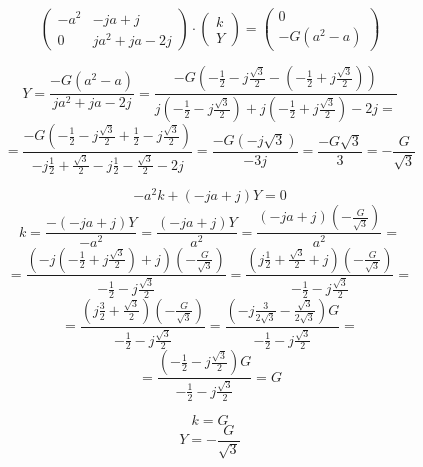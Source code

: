 \documentclass{article}
\begin{document}
$$
    \begin{pmatrix}
        -a^2 & - j a + j         \\
        0    & j a^2 + j a - 2 j
    \end{pmatrix}
    \cdot
    \begin{pmatrix}
        k \\
        Y
    \end{pmatrix}
    =
    \begin{pmatrix}
        0 \\
        - G (a^2 - a)
    \end{pmatrix}
$$

$$
    Y = \frac{- G (a^2 - a)}{j a^2 + j a - 2 j} = \frac{
        - G \left( -\frac{1}{2} - j \frac{\sqrt{3}}{2} - \left( -\frac{1}{2} + j \frac{\sqrt{3}}{2} \right) \right)
    }{
        j \left( -\frac{1}{2} - j \frac{\sqrt{3}}{2} \right) + j \left( -\frac{1}{2} + j \frac{\sqrt{3}}{2} \right) - 2 j =
    }
$$
$$
    = \frac{
        - G \left( -\frac{1}{2} - j \frac{\sqrt{3}}{2} + \frac{1}{2} - j \frac{\sqrt{3}}{2} \right)
    }{
        -j \frac{1}{2} + \frac{\sqrt{3}}{2} - j \frac{1}{2} - \frac{\sqrt{3}}{2} - 2 j
    } = \frac{
        - G \left( -j \sqrt{3} \right)
    }{
        -3 j
    } = \frac{- G \sqrt{3}}{3} = -\frac{G}{\sqrt{3}}
$$

$$
    -a^2 k + (-j a + j) Y = 0
$$
$$
    k = \frac{- (-j a + j) Y}{-a^2} = \frac{(-j a + j) Y}{a^2} = \frac{(-j a + j) \left( -\frac{G}{\sqrt{3}} \right)}{a^2} =
$$
$$
    = \frac{
        \left( -j \left( -\frac{1}{2} + j \frac{\sqrt{3}}{2} \right) + j \right) \left( -\frac{G}{\sqrt{3}} \right)
    }{
        -\frac{1}{2} - j \frac{\sqrt{3}}{2}
    } = \frac{
        \left( j \frac{1}{2} + \frac{\sqrt{3}}{2} + j \right) \left( -\frac{G}{\sqrt{3}} \right)
    }{
        -\frac{1}{2} - j \frac{\sqrt{3}}{2}
    } =
$$
$$
    = \frac{
        \left( j \frac{3}{2} + \frac{\sqrt{3}}{2} \right) \left( -\frac{G}{\sqrt{3}} \right)
    }{
        -\frac{1}{2} - j \frac{\sqrt{3}}{2}
    } = \frac{
        \left( - j \frac{3}{2 \sqrt{3}} - \frac{\sqrt{3}}{2 \sqrt{3}} \right) G
    }{
        -\frac{1}{2} - j \frac{\sqrt{3}}{2}
    } =
$$
$$
    = \frac{
        \left( -\frac{1}{2} - j \frac{\sqrt{3}}{2} \right) G
    }{
        -\frac{1}{2} - j \frac{\sqrt{3}}{2}
    } = G
$$

$$
    k = G
$$
$$
    Y = -\frac{G}{\sqrt{3}}
$$
\end{document}
